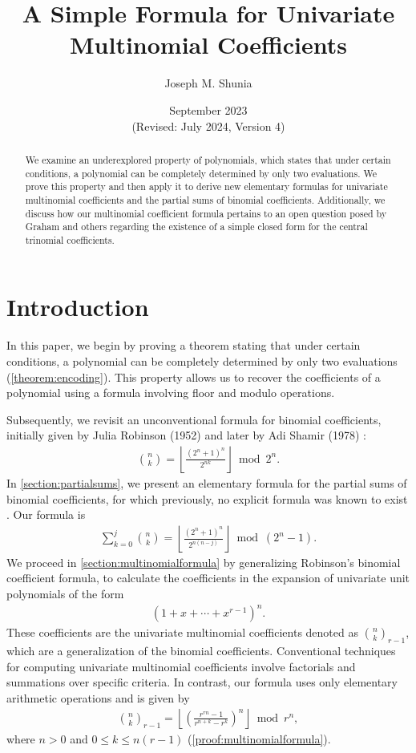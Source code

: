 \documentclass{article}
\title{A Simple Formula for Univariate Multinomial Coefficients}
\author{Joseph M. Shunia}
\date{September 2023 \\ \small (Revised: July 2024, Version 4) \normalsize}
\theoremstyle{plain}
\theoremstyle{definition}
\newcommand{\floor}[1]{\left\lfloor #1 \right\rfloor}
\begin{document}
\maketitle

\begin{abstract}
We examine an underexplored property of polynomials, which states that under certain conditions, a polynomial can be completely determined by only two evaluations. We prove this property and then apply it to derive new elementary formulas for univariate multinomial coefficients and the partial sums of binomial coefficients. Additionally, we discuss how our multinomial coefficient formula pertains to an open question posed by Graham and others regarding the existence of a simple closed form for the central trinomial coefficients.
\end{abstract}

\section{Introduction}
In this paper, we begin by proving a theorem stating that under certain conditions, a polynomial can be completely determined by only two evaluations (\cref{theorem:encoding}). This property allows us to recover the coefficients of a polynomial using a formula involving floor and modulo operations.

Subsequently, we revisit an unconventional formula for binomial coefficients, initially given by Julia Robinson (1952) \cite{robinson1952arithmetic} and later by Adi Shamir (1978) \cite{shamir1978factoring}:
\begin{align*}
\binom{n}{k} = \left\lfloor\frac{(2^n+1)^n}{2^{n k}}\right\rfloor \bmod{2^{n}} .
\end{align*}
In \cref{section:partialsums}, we present an elementary formula for the partial sums of binomial coefficients, for which previously, no explicit formula was known to exist \cite{boardman2004eggdropnumbers}. Our formula is
\begin{align*}
\sum_{k=0}^{j} \binom{n}{k}
= \floor{\frac{(2^n+1)^n}{2^{n(n-j)}}} \bmod (2^n-1) .
\end{align*}
We proceed in \cref{section:multinomialformula} by generalizing Robinson's binomial coefficient formula, to calculate the coefficients in the expansion of univariate unit polynomials of the form
\begin{align*}
 [x^k](1 + x + \cdots + x^{r-1})^n .
\end{align*}
These coefficients are the univariate multinomial coefficients denoted as $\binom{n}{k}_{r-1}$, which are a generalization of the binomial coefficients. Conventional techniques for computing univariate multinomial coefficients involve factorials and summations over specific criteria. In contrast, our formula uses only elementary arithmetic operations and is given by
\begin{align*}
    \binom{n}{k}_{r-1} = \left\lfloor\left(\frac{r^{rn} - 1}{r^{n+k} - r^k}\right)^n\right\rfloor \bmod r^n ,
\end{align*}
where $n > 0$ and $0 \leq k \leq n (r-1)$ (\cref{proof:multinomialformula}).
\end{document}
